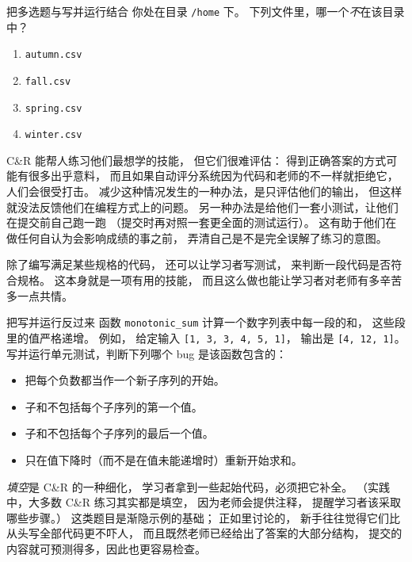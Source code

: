 \begin{aside}{把多选题与写并运行结合}
  你处在目录 \texttt{/home} 下。
  下列文件里，哪一个\emph{不}在该目录中？

  \begin{enumerate}
  \item
    \texttt{autumn.csv}
  \item
    \texttt{fall.csv}
  \item
    \texttt{spring.csv}
  \item
    \texttt{winter.csv}
  \end{enumerate}
\end{aside}

C\&R 能帮人练习他们最想学的技能，
但它们很难评估：
得到正确答案的方式可能有很多出乎意料，
而且如果自动评分系统因为代码和老师的不一样就拒绝它，
人们会很受打击。
减少这种情况发生的一种办法，是只评估他们的输出，
但这样就没法反馈他们在编程方式上的问题。
另一种办法是给他们一套小测试，让他们在提交前自己跑一跑
（提交时再对照一套更全面的测试运行）。
这有助于他们在做任何自认为会影响成绩的事之前，
弄清自己是不是完全误解了练习的意图。

除了编写满足某些规格的代码，
还可以让学习者写测试，
来判断一段代码是否符合规格。
这本身就是一项有用的技能，
而且这么做也能让学习者对老师有多辛苦多一点共情。

\begin{aside}{把写并运行反过来}
  函数 \texttt{monotonic\_sum} 计算一个数字列表中每一段的和，
  这些段里的值严格递增。
  例如，
  给定输入 \texttt{[1,\ 3,\ 3,\ 4,\ 5,\ 1]}，
  输出是 \texttt{[4,\ 12,\ 1]}。
  写并运行单元测试，判断下列哪个 bug 是该函数包含的：

  \begin{itemize}
  \item
    把每个负数都当作一个新子序列的开始。
  \item
    子和不包括每个子序列的第一个值。
  \item
    子和不包括每个子序列的最后一个值。
  \item
    只在值下降时（而不是在值未能递增时）重新开始求和。
  \end{itemize}
\end{aside}

\emph{填空}是 C\&R 的一种细化，
学习者拿到一些起始代码，必须把它补全。
（实践中，大多数 C\&R 练习其实都是填空，
因为老师会提供注释，
提醒学习者该采取哪些步骤。）
这类题目是渐隐示例的基础；
正如里讨论的，
新手往往觉得它们比从头写全部代码更不吓人，
而且既然老师已经给出了答案的大部分结构，
提交的内容就可预测得多，因此也更容易检查。


